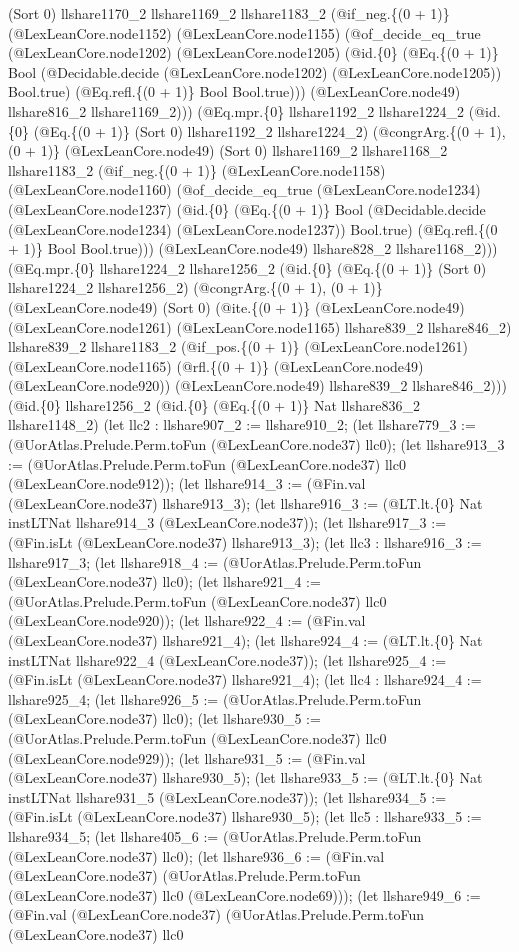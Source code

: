 \documentclass[11pt]{article}
\begin{document}
(Sort 0) llshare1170\_2 llshare1169\_2 llshare1183\_2 (@if\_neg.\{(0 + 1)\} (@LexLeanCore.node1152) (@LexLeanCore.node1155) (@of\_decide\_eq\_true (@LexLeanCore.node1202) (@LexLeanCore.node1205) (@id.\{0\} (@Eq.\{(0 + 1)\} Bool (@Decidable.decide (@LexLeanCore.node1202) (@LexLeanCore.node1205)) Bool.true) (@Eq.refl.\{(0 + 1)\} Bool Bool.true))) (@LexLeanCore.node49) llshare816\_2 llshare1169\_2))) (@Eq.mpr.\{0\} llshare1192\_2 llshare1224\_2 (@id.\{0\} (@Eq.\{(0 + 1)\} (Sort 0) llshare1192\_2 llshare1224\_2) (@congrArg.\{(0 + 1), (0 + 1)\} (@LexLeanCore.node49) (Sort 0) llshare1169\_2 llshare1168\_2 llshare1183\_2 (@if\_neg.\{(0 + 1)\} (@LexLeanCore.node1158) (@LexLeanCore.node1160) (@of\_decide\_eq\_true (@LexLeanCore.node1234) (@LexLeanCore.node1237) (@id.\{0\} (@Eq.\{(0 + 1)\} Bool (@Decidable.decide (@LexLeanCore.node1234) (@LexLeanCore.node1237)) Bool.true) (@Eq.refl.\{(0 + 1)\} Bool Bool.true))) (@LexLeanCore.node49) llshare828\_2 llshare1168\_2))) (@Eq.mpr.\{0\} llshare1224\_2 llshare1256\_2 (@id.\{0\} (@Eq.\{(0 + 1)\} (Sort 0) llshare1224\_2 llshare1256\_2) (@congrArg.\{(0 + 1), (0 + 1)\} (@LexLeanCore.node49) (Sort 0) (@ite.\{(0 + 1)\} (@LexLeanCore.node49) (@LexLeanCore.node1261) (@LexLeanCore.node1165) llshare839\_2 llshare846\_2) llshare839\_2 llshare1183\_2 (@if\_pos.\{(0 + 1)\} (@LexLeanCore.node1261) (@LexLeanCore.node1165) (@rfl.\{(0 + 1)\} (@LexLeanCore.node49) (@LexLeanCore.node920)) (@LexLeanCore.node49) llshare839\_2 llshare846\_2))) (@id.\{0\} llshare1256\_2 (@id.\{0\} (@Eq.\{(0 + 1)\} Nat llshare836\_2 llshare1148\_2) (let llc2 : llshare907\_2 := llshare910\_2; (let llshare779\_3 := (@UorAtlas.Prelude.Perm.toFun (@LexLeanCore.node37) llc0); (let llshare913\_3 := (@UorAtlas.Prelude.Perm.toFun (@LexLeanCore.node37) llc0 (@LexLeanCore.node912)); (let llshare914\_3 := (@Fin.val (@LexLeanCore.node37) llshare913\_3); (let llshare916\_3 := (@LT.lt.\{0\} Nat instLTNat llshare914\_3 (@LexLeanCore.node37)); (let llshare917\_3 := (@Fin.isLt (@LexLeanCore.node37) llshare913\_3); (let llc3 : llshare916\_3 := llshare917\_3; (let llshare918\_4 := (@UorAtlas.Prelude.Perm.toFun (@LexLeanCore.node37) llc0); (let llshare921\_4 := (@UorAtlas.Prelude.Perm.toFun (@LexLeanCore.node37) llc0 (@LexLeanCore.node920)); (let llshare922\_4 := (@Fin.val (@LexLeanCore.node37) llshare921\_4); (let llshare924\_4 := (@LT.lt.\{0\} Nat instLTNat llshare922\_4 (@LexLeanCore.node37)); (let llshare925\_4 := (@Fin.isLt (@LexLeanCore.node37) llshare921\_4); (let llc4 : llshare924\_4 := llshare925\_4; (let llshare926\_5 := (@UorAtlas.Prelude.Perm.toFun (@LexLeanCore.node37) llc0); (let llshare930\_5 := (@UorAtlas.Prelude.Perm.toFun (@LexLeanCore.node37) llc0 (@LexLeanCore.node929)); (let llshare931\_5 := (@Fin.val (@LexLeanCore.node37) llshare930\_5); (let llshare933\_5 := (@LT.lt.\{0\} Nat instLTNat llshare931\_5 (@LexLeanCore.node37)); (let llshare934\_5 := (@Fin.isLt (@LexLeanCore.node37) llshare930\_5); (let llc5 : llshare933\_5 := llshare934\_5; (let llshare405\_6 := (@UorAtlas.Prelude.Perm.toFun (@LexLeanCore.node37) llc0); (let llshare936\_6 := (@Fin.val (@LexLeanCore.node37) (@UorAtlas.Prelude.Perm.toFun (@LexLeanCore.node37) llc0 (@LexLeanCore.node69))); (let llshare949\_6 := (@Fin.val (@LexLeanCore.node37) (@UorAtlas.Prelude.Perm.toFun (@LexLeanCore.node37) llc0 
\end{document}
